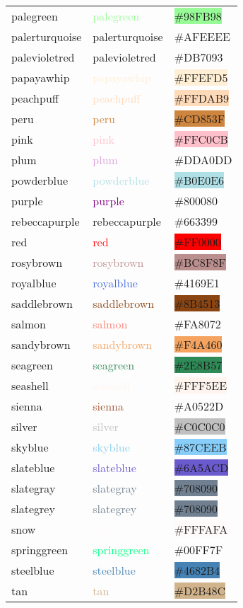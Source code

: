 \documentclass[
]{article}
\begin{document}
\begin{longtable}[]{@{}lll@{}}
palegreen & \textcolor{palegreen}{palegreen} &
\colorbox{palegreen}{\#98FB98}\tabularnewline
palerturquoise & \textcolor{paleblue}{palerturquoise} &
\colorbox{paleblue}{\#AFEEEE}\tabularnewline
palevioletred & \textcolor{palered-violet}{palevioletred} &
\colorbox{palered-violet}{\#DB7093}\tabularnewline
papayawhip & \textcolor{papayawhip}{papayawhip} &
\colorbox{papayawhip}{\#FFEFD5}\tabularnewline
peachpuff & \textcolor{peachpuff}{peachpuff} &
\colorbox{peachpuff}{\#FFDAB9}\tabularnewline
peru & \textcolor{peru}{peru} & \colorbox{peru}{\#CD853F}\tabularnewline
pink & \textcolor{pink}{pink} & \colorbox{pink}{\#FFC0CB}\tabularnewline
plum & \textcolor{plum}{plum} &
\colorbox{mediumlavendermagenta}{\#DDA0DD}\tabularnewline
powderblue & \textcolor{powderblue}{powderblue} &
\colorbox{powderblue}{\#B0E0E6}\tabularnewline
purple & \textcolor{purple}{purple} &
\colorbox{patriarch}{\#800080}\tabularnewline
rebeccapurple & \textcolor{purpleheart}{rebeccapurple} &
\colorbox{purpleheart}{\#663399}\tabularnewline
red & \textcolor{red}{red} & \colorbox{red}{\#FF0000}\tabularnewline
rosybrown & \textcolor{rosybrown}{rosybrown} &
\colorbox{rosybrown}{\#BC8F8F}\tabularnewline
royalblue & \textcolor{royalblue}{royalblue} &
\colorbox{hanblue}{\#4169E1}\tabularnewline
saddlebrown & \textcolor{saddlebrown}{saddlebrown} &
\colorbox{saddlebrown}{\#8B4513}\tabularnewline
salmon & \textcolor{salmon}{salmon} &
\colorbox{coralpink}{\#FA8072}\tabularnewline
sandybrown & \textcolor{sandybrown}{sandybrown} &
\colorbox{sandybrown}{\#F4A460}\tabularnewline
seagreen & \textcolor{seagreen}{seagreen} &
\colorbox{seagreen}{\#2E8B57}\tabularnewline
seashell & \textcolor{seashell}{seashell} &
\colorbox{seashell}{\#FFF5EE}\tabularnewline
sienna & \textcolor{sienna}{sienna} &
\colorbox{mediumcarmine}{\#A0522D}\tabularnewline
silver & \textcolor{silver}{silver} &
\colorbox{silver}{\#C0C0C0}\tabularnewline
skyblue & \textcolor{skyblue}{skyblue} &
\colorbox{lightskyblue}{\#87CEEB}\tabularnewline
slateblue & \textcolor{slateblue}{slateblue} &
\colorbox{slateblue}{\#6A5ACD}\tabularnewline
slategray & \textcolor{slategray}{slategray} &
\colorbox{slategray}{\#708090}\tabularnewline
slategrey & \textcolor{slategray}{slategrey} &
\colorbox{slategray}{\#708090}\tabularnewline
snow & \textcolor{snow}{snow} & \colorbox{snow}{\#FFFAFA}\tabularnewline
springgreen & \textcolor{springgreen}{springgreen} &
\colorbox{guppiegreen}{\#00FF7F}\tabularnewline
steelblue & \textcolor{steelblue}{steelblue} &
\colorbox{steelblue}{\#4682B4}\tabularnewline
tan & \textcolor{tan}{tan} & \colorbox{tan}{\#D2B48C}\tabularnewline

\end{longtable}
\end{document}

